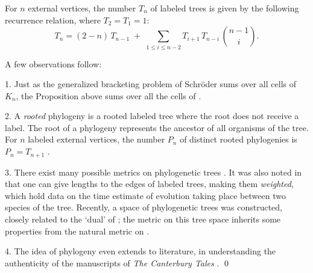 \documentclass[10pt]{amsart}
\begin{document}
            \begin{prop} \textup{\cite[\S2]{fr}}
            For $n$ external vertices, the number $T_n$ of labeled trees is given by the following recurrence relation, where $T_2=T_1=1$:
            $$ T_n = (2-n) \, T_{n-1} \;+\; \sum_{1 \leq i \leq n-2} T_{i+1} \, T_{n-i} \, \binom{n-1}{i}.$$
            \end{prop}
            
            \begin{rem} A few observations follow:
            
            1. Just as the generalized bracketing problem of Schr\"oder sums over all cells of $K_n$, the Proposition above sums over all the cells of .
            
            2. A {\em rooted} phylogeny is a rooted labeled tree where the root does not receive a label. The root of a phylogeny represents the ancestor of all organisms of the tree. For $n$ labeled external vertices, the number $P_n$ of distinct rooted phylogenies is $P_n = T_{n+1}$ \cite[\S2]{fr}.
            
            3. There exist many possible metrics on phylogenetic trees \cite{fr1}.  It was also noted in \cite{ph} that one can give lengths to the edges of labeled trees, making them {\em weighted}, which hold data on the time estimate of evolution taking place between two species of the tree.  Recently, a space of phylogenetic trees was constructed, closely related to the `dual' of  \cite{bhv}; the metric on this tree space inherits some properties from the natural metric on  \cite[\S2.2]{dev}.
            
            4. The idea of phylogeny even extends to literature, in understanding the authenticity of the manuscripts of {\em The Canterbury Tales} \cite{ct}.
            \qed
            \end{rem}
            
                        
\end{document}
